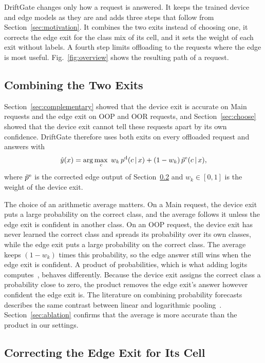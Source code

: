 DriftGate changes only how a request is answered. It keeps the trained device and edge models as they are and adds three steps that follow from Section~\ref{sec:motivation}. It combines the two exits instead of choosing one, it corrects the edge exit for the class mix of its cell, and it sets the weight of each exit without labels. A fourth step limits offloading to the requests where the edge is most useful. Fig.~\ref{fig:overview} shows the resulting path of a request.

\subsection{Combining the Two Exits}
\label{sec:combine}

Section~\ref{sec:complementary} showed that the device exit is accurate on Main requests and the edge exit on OOP and OOR requests, and Section~\ref{sec:choose} showed that the device exit cannot tell these requests apart by its own confidence. DriftGate therefore uses both exits on every offloaded request and answers with
\begin{equation}
\hat y(x)=\arg\max_c\; w_k\,p^{\mathrm{d}}(c\,|\,x)+(1-w_k)\,\tilde p^{\mathrm{e}}(c\,|\,x),
\label{eq:combine}
\end{equation}
where $\tilde p^{\mathrm{e}}$ is the corrected edge output of Section~\ref{sec:correct} and $w_k\in[0,1]$ is the weight of the device exit.

The choice of an arithmetic average matters. On a Main request, the device exit puts a large probability on the correct class, and the average follows it unless the edge exit is confident in another class. On an OOP request, the device exit has never learned the correct class and spreads its probability over its own classes, while the edge exit puts a large probability on the correct class. The average keeps $(1-w_k)$ times this probability, so the edge answer still wins when the edge exit is confident. A product of probabilities, which is what adding logits computes~\cite{chen2022fedrod,wolczyk2021ztw}, behaves differently. Because the device exit assigns the correct class a probability close to zero, the product removes the edge exit's answer however confident the edge exit is. The literature on combining probability forecasts describes the same contrast between linear and logarithmic pooling~\cite{genest1986combining}. Section~\ref{sec:ablation} confirms that the average is more accurate than the product in our settings.

\subsection{Correcting the Edge Exit for Its Cell}
\label{sec:correct}

